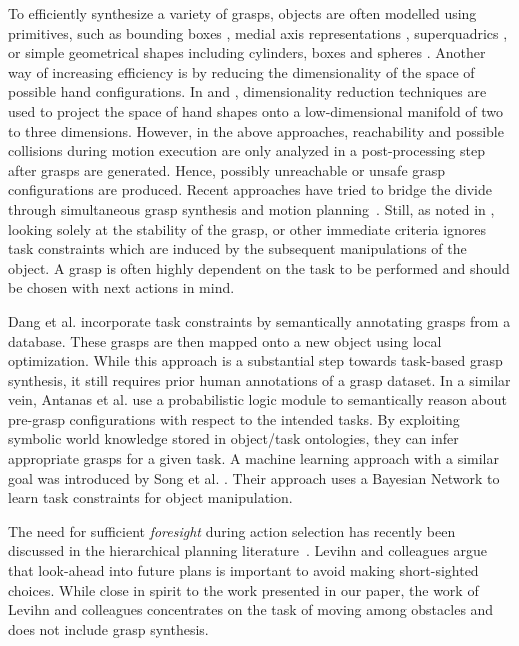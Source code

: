 \documentclass[a4paper,10pt,twocolumn]{article}
\begin{document}
To efficiently synthesize a 
variety of grasps, objects are often modelled
using primitives, such as bounding boxes \cite{huebner2008selection}, medial axis
representations \cite{przybylski2010unions}, superquadrics \cite{goldfeder2007grasp}, 
or simple geometrical shapes including cylinders, boxes and spheres \cite{miller2003automatic}.
Another way of increasing efficiency is by reducing the dimensionality of
the space of possible hand configurations. In \cite{ciocarlie2009} and \cite{benamor}, 
dimensionality reduction techniques are used to project the space of
hand shapes onto a low-dimensional manifold of two to three dimensions.
However, in the above approaches, reachability and possible collisions
during motion execution are only analyzed in a post-processing step after 
grasps are generated. Hence, possibly unreachable or unsafe grasp configurations 
are produced. Recent approaches have tried to bridge the divide through simultaneous 
grasp synthesis and motion planning~\cite{Vahrenkamp12d}. Still, as noted in \cite{dang}, 
looking solely at the stability of the grasp, or other
immediate criteria ignores task constraints which 
are induced by the subsequent manipulations of the object. 
A grasp is often highly dependent on the task 
to be performed and should be chosen with next actions in mind.

Dang et al. \cite{dang} incorporate task constraints by 
semantically annotating grasps from a database. These grasps
are then mapped onto a new object using local optimization.
While this approach is a substantial step towards task-based
grasp synthesis, it still requires prior human annotations of 
a grasp dataset. In a similar vein, Antanas et al. \cite{antanas} 
use a probabilistic logic module to semantically reason
about pre-grasp configurations with respect to the intended tasks.
By exploiting symbolic world knowledge stored in object/task ontologies,
they can infer appropriate grasps for a given task. 
A machine learning approach with a similar goal
was introduced by Song et al. \cite{song}. Their approach 
uses a Bayesian Network to learn task constraints for 
object manipulation. 

The need for sufficient \emph{foresight} 
during action selection has recently been discussed in the hierarchical
planning literature~\cite{LevihnIROS13}. Levihn and colleagues
argue that look-ahead into future plans is important to 
avoid making short-sighted choices. While close in spirit to the 
work presented in our paper, the work of Levihn and colleagues 
concentrates on the task of moving among obstacles and does not 
include grasp synthesis.
\end{document}
